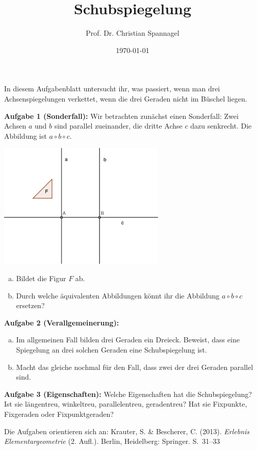 \documentclass{../cssheet}
\title{Schubspiegelung}
\author{Prof. Dr. Christian Spannagel}
\date{\today}
\begin{document}
\printtitle

In diesem Aufgabenblatt untersucht ihr, was passiert, wenn man drei Achsenspiegelungen verkettet, wenn die drei Geraden nicht im Büschel liegen.

\textbf{Aufgabe 1 (Sonderfall):}  Wir betrachten zunächst einen Sonderfall: Zwei Achsen $a$ und $b$ sind parallel zueinander, die dritte Achse $c$ dazu senkrecht. Die Abbildung ist $a\circ b\circ c$.
\begin{center}
\includegraphics[width=8cm]{schubspiegelung.png}
\end{center}

\begin{enumerate}[a)]
\item Bildet die Figur $F$ ab.
\item Durch welche äquivalenten Abbildungen könnt ihr die Abbildung $a\circ b\circ c$ ersetzen?
\end{enumerate}

\textbf{Aufgabe 2 (Verallgemeinerung):} 
\begin{enumerate}[a)]
\item Im allgemeinen Fall bilden drei Geraden ein Dreieck. Beweist, dass eine Spiegelung an drei solchen Geraden eine Schubspiegelung ist.
\item Macht das gleiche nochmal für den Fall, dass zwei der drei Geraden parallel sind.
\end{enumerate}

\textbf{Aufgabe 3 (Eigenschaften):}  Welche Eigenschaften hat die Schubspiegelung? Ist sie längentreu, winkeltreu, parallelentreu, geradentreu? Hat sie Fixpunkte, Fixgeraden oder Fixpunktgeraden?

\vspace*{10mm}
Die Aufgaben orientieren sich an: Krauter, S. \& Bescherer, C. (2013). \emph{Erlebnis Elementargeometrie} (2. Aufl.). Berlin, Heidelberg: Springer. S.~31--33


\printlicense

\printsocials
\end{document}
